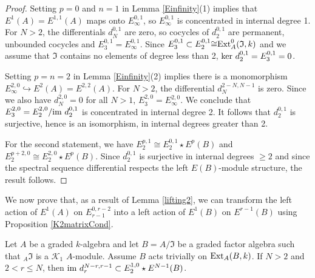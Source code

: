 \documentclass[11pt,righttag]{amsart}
\begin{document}
  \begin{proof}
   Setting $p=0$ and $n=1$ in Lemma \ref{Einfinity}(1) implies that $E^1(A)=E^{1,1}(A)$ maps onto $E_{\infty}^{0,1}$, so $E_{\infty}^{0,1}$ is concentrated in internal degree 1. For $N>2$, the differentials $d_N^{0,1}$ are zero, so cocycles of $d_2^{0,1}$ are permanent, unbounded cocycles and $E_3^{0,1}=E_{\infty}^{0,1}$. Since $E_3^{0,1}\subset E_2^{0,1}{\cong} {\hbox{{\rm Ext}}}_A^0({\mathfrak{I}},k)$ and we assume that ${\mathfrak{I}}$ contains no elements of degree less than 2, ${\hbox{ker}}\ d_2^{0,1}=E_3^{0,1}=0$. 
      
  Setting $p=n=2$ in Lemma \ref{Einfinity}(2) implies  there is a monomorphism $E_{\infty}^{2,0}\hookrightarrow E^2(A)=E^{2,2}(A)$.  For $N>2$, the differential $d_N^{2-N,N-1}$ is zero. Since we also have $d_N^{2,0}=0$ for all $N>1$,  $E_3^{2,0}=E_{\infty}^{2,0}$. We conclude that $E_3^{2,0}=E_2^{2,0}/{\hbox{im}}\ d_2^{0,1}$ is concentrated in internal degree 2. It follows that $d_2^{0,1}$ is surjective, hence is an isomorphism, in internal degrees greater than 2.
  
 For the second statement, we have $E_2^{p,1}{\cong} E_2^{0,1}\star E^p(B)$ and $E_2^{p+2,0}{\cong} E_2^{2,0}\star E^p(B)$. Since $d_2^{0,1}$ is surjective in internal degrees $\ge 2$ and since the spectral sequence differential respects the left $E(B)$-module structure, the result follows.
 
  \end{proof}
  
  We now prove that, as a result of Lemma \ref{lifting2}, we can transform the left action of $E^1(A)$ on $E_{r-1}^{0,r-2}$ into a left action of $E^1(B)$ on $E^{r-1}(B)$ using Proposition \ref{K2matrixCond}.
  

  \begin{prop}
  \label{survivesForever}
Let $A$ be a graded $k$-algebra and let $B=A/{\mathfrak{I}}$ be a graded factor algebra such that $_A{\mathfrak{I}}$ is a ${{\mathcal K}}_1$ $A$-module. Assume $B$ acts trivially on ${\hbox{{\rm Ext}}}_A(B,k)$.  If $N> 2$ and $2< r\le N$, then ${\hbox{im}}\ d_r^{N-r,r-1}\subset E_2^{1,0}\star E^{N-1}(B)$.
    \end{prop} 
\end{document}

